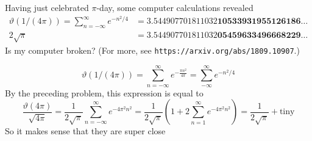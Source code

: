 \documentclass{homework}
\begin{document}
                                                                                                  \begin{problem}
                                                                                                    Having just celebrated $\pi$-day, some computer calculations revealed
                                                                                                    \begin{align*}
                                                                                                      \vartheta(1/(4\pi)) = \sum_{n=-\infty}^\infty e^{-n^2/4} &=
                                                                                                      3.544907701811032\textbf{10533931955126186}\ldots \\
                                                                                                        2\sqrt{\pi} &=
                                                                                                        3.544907701811032\textbf{05459633496668229}\ldots
                                                                                                        \end{align*}
                                                                                                        Is my computer broken?  (For more, see \texttt{https://arxiv.org/abs/1809.10907}.)
                                                                                                        \end{problem}
                                                                                                        \begin{solution}
                                                                                                        \[
                                                                                                        \vartheta(1/(4\pi)) = \sum_{n=-\infty}^\infty e^{-\frac{\pi n^2}{4\pi}} = \sum_{-\infty}^\infty e^{-n^2/4}
                                                                                                        \]
                                                                                                        By the preceding problem, this expression is equal to 
                                                                                                        \[
                                                                                                        \frac{\vartheta(4\pi)}{\sqrt{4\pi}} = \frac{1}{2\sqrt{\pi}}\sum_{n=-\infty}^\infty e^{-4\pi^2 n^2} = \frac{1}{2\sqrt{\pi}}\left(1 + 2\sum_{n=1}^\infty e^{-4\pi^2 n^2}\right) = \frac{1}{2\sqrt{\pi}} + \text{tiny}
                                                                                                        \]
                                                                                                        So it makes sense that they are super close
                                                                                                        \end{solution}
\end{document}
